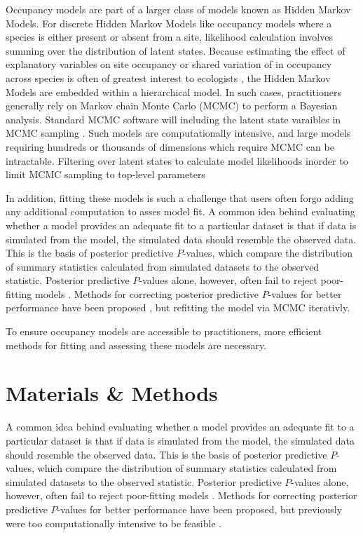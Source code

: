 \documentclass[12pt]{article}
\begin{document}
Occupancy models are part of a larger class of models known as Hidden
Markov Models. For discrete Hidden Markov Models like occupancy models
where a species is either present or absent from a site, likelihood
calculation involves summing over the distribution of latent
states. Because estimating the effect of explanatory variables on site
occupancy or shared variation of in occupancy across species is often
of greatest interest to ecologists
\citep[e.g.,][]{iknayan2014detecting}, the Hidden Markov Models are
embedded within a hierarchical model. In such cases, practitioners
generally rely on Markov chain Monte Carlo (MCMC) to perform a
Bayesian analysis. Standard MCMC software will including the latent
state varaibles in MCMC sampling \citep[e.g.,][]{plummer-2003-jags,
  winbugs, openbugs}. Such models are computationally intensive, and
large models requiring hundreds or thousands of dimensions which
require MCMC can be intractable. Filtering over latent states to
calculate model likelihoods inorder to limit MCMC sampling to
top-level parameters \citep{turek2016efficient}

In addition, fitting these models is such a challenge that users often
forgo adding any additional computation to asses model fit.  A common
idea behind evaluating whether a model provides an adequate fit to a
particular dataset is that if data is simulated from the model, the
simulated data should resemble the observed data. This is the basis of
posterior predictive $P$-values, which compare the distribution of
summary statistics calculated from simulated datasets to the observed
statistic. Posterior predictive $P$-values alone, however, often fail
to reject poor-fitting models \citep{bayarri-berger-00,
  robins-etal-00, hjort-etal-06}. Methods for correcting posterior
predictive $P$-values for better performance have been proposed
\citep[e.g., calibrated posterior predictive $P$-values,
][]{hjort-etal-06}, but refitting the model via MCMC iterativly.

To ensure occupancy models are accessible to practitioners, more
efficient methods for fitting and assessing these models are
necessary.



\section*{Materials \& Methods}

A common idea behind evaluating whether a model provides an adequate
fit to a particular dataset is that if data is simulated from the
model, the simulated data should resemble the observed data. This is
the basis of posterior predictive $P$-values, which compare the
distribution of summary statistics calculated from simulated datasets
to the observed statistic. Posterior predictive $P$-values alone,
however, often fail to reject poor-fitting models
\citep{bayarri-berger-00, robins-etal-00, hjort-etal-06}. Methods for
correcting posterior predictive $P$-values for better performance have
been proposed, but previously were too computationally intensive to be
feasible \citep[e.g., calibrated posterior predictive $P$-values,
][]{hjort-etal-06}.
\end{document}
